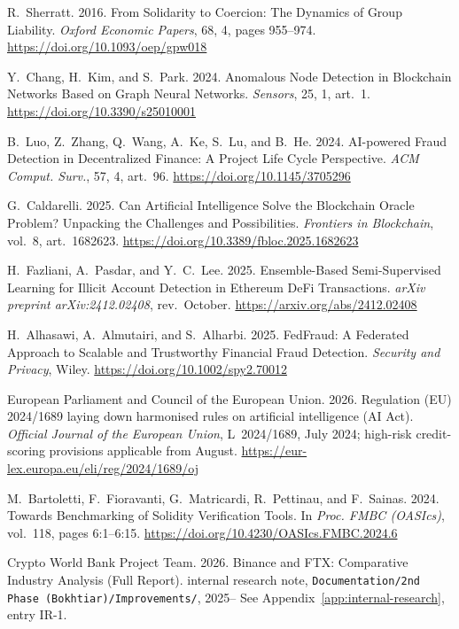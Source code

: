 \documentclass[12pt, a4paper]{report}
\begin{document}
{\begin{enumerate}[label={[\arabic*]}]
\item R.~Sherratt. 2016. From Solidarity to Coercion: The Dynamics of Group Liability. \emph{Oxford Economic Papers}, 68, 4, pages 955--974. \url{https://doi.org/10.1093/oep/gpw018}

\item Y.~Chang, H.~Kim, and S.~Park. 2024. Anomalous Node Detection in Blockchain Networks Based on Graph Neural Networks. \emph{Sensors}, 25, 1, art.~1. \url{https://doi.org/10.3390/s25010001}

\item B.~Luo, Z.~Zhang, Q.~Wang, A.~Ke, S.~Lu, and B.~He. 2024. AI-powered Fraud Detection in Decentralized Finance: A Project Life Cycle Perspective. \emph{ACM Comput. Surv.}, 57, 4, art.~96. \url{https://doi.org/10.1145/3705296}

\item G.~Caldarelli. 2025. Can Artificial Intelligence Solve the Blockchain Oracle Problem? Unpacking the Challenges and Possibilities. \emph{Frontiers in Blockchain}, vol.~8, art.~1682623. \url{https://doi.org/10.3389/fbloc.2025.1682623}

\item H.~Fazliani, A.~Pasdar, and Y.~C.~Lee. 2025. Ensemble-Based Semi-Supervised Learning for Illicit Account Detection in Ethereum DeFi Transactions. \emph{arXiv preprint arXiv:2412.02408}, rev.~October. \url{https://arxiv.org/abs/2412.02408}

\item H.~Alhasawi, A.~Almutairi, and S.~Alharbi. 2025. FedFraud: A Federated Approach to Scalable and Trustworthy Financial Fraud Detection. \emph{Security and Privacy}, Wiley. \url{https://doi.org/10.1002/spy2.70012}

\item European Parliament and Council of the European Union. 2026. Regulation (EU) 2024/1689 laying down harmonised rules on artificial intelligence (AI Act). \emph{Official Journal of the European Union}, L~2024/1689, July 2024; high-risk credit-scoring provisions applicable from August. \url{https://eur-lex.europa.eu/eli/reg/2024/1689/oj}

\item M.~Bartoletti, F.~Fioravanti, G.~Matricardi, R.~Pettinau, and F.~Sainas. 2024. Towards Benchmarking of Solidity Verification Tools. In \emph{Proc. FMBC (OASIcs)}, vol.~118, pages 6:1--6:15. \url{https://doi.org/10.4230/OASIcs.FMBC.2024.6}

\item Crypto World Bank Project Team. 2026. Binance and FTX: Comparative Industry Analysis (Full Report). internal research note, \texttt{Documentation/2nd Phase (Bokhtiar)/Improvements/}, 2025-- See Appendix~\ref{app:internal-research}, entry IR-1.


\end{enumerate}}
\end{document}
